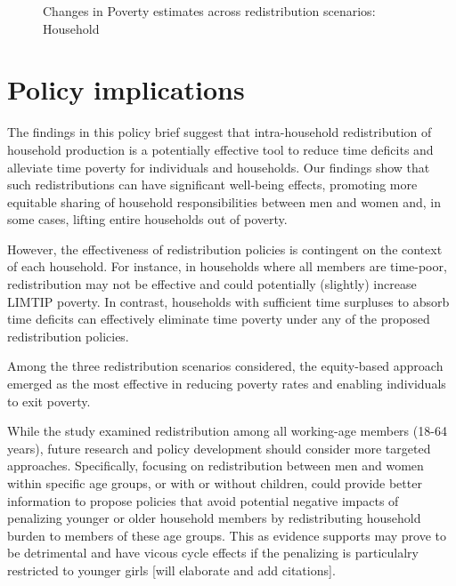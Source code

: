 \documentclass[
  11pt,
]{article}
\begin{document}
\begin{figure}[H]


\caption{\label{fig-limtip1}Changes in Poverty estimates across
redistribution scenarios: Household}

\end{figure}%

\section{Policy implications}\label{policy-implications}

The findings in this policy brief suggest that intra-household
redistribution of household production is a potentially effective tool
to reduce time deficits and alleviate time poverty for individuals and
households. Our findings show that such redistributions can have
significant well-being effects, promoting more equitable sharing of
household responsibilities between men and women and, in some cases,
lifting entire households out of poverty.

However, the effectiveness of redistribution policies is contingent on
the context of each household. For instance, in households where all
members are time-poor, redistribution may not be effective and could
potentially (slightly) increase LIMTIP poverty. In contrast, households
with sufficient time surpluses to absorb time deficits can effectively
eliminate time poverty under any of the proposed redistribution
policies.

Among the three redistribution scenarios considered, the equity-based
approach emerged as the most effective in reducing poverty rates and
enabling individuals to exit poverty.

While the study examined redistribution among all working-age members
(18-64 years), future research and policy development should consider
more targeted approaches. Specifically, focusing on redistribution
between men and women within specific age groups, or with or without
children, could provide better information to propose policies that
avoid potential negative impacts of penalizing younger or older
household members by redistributing household burden to members of these
age groups. This as evidence supports may prove to be detrimental and
have vicous cycle effects if the penalizing is particulalry restricted
to younger girls {[}will elaborate and add citations{]}.
\end{document}
